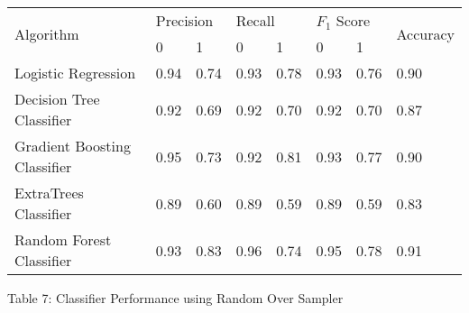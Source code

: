\documentclass[12pt,letter-paper]{article}
\begin{document}
            \begin{table}[H]
        \begin{center}
            \begin{tabular}{|l|l|l|l|l|l|l|l|}
                \hline
                \multirow{2}{*}{Algorithm} & \multicolumn{2}{l|}{Precision} & \multicolumn{2}{l|}{Recall} & \multicolumn{2}{l|}{$F_1$ Score} & \multirow{2}{*}{Accuracy} \\ \cline{2-7}
                                   & 0              & 1             & 0            & 1            & 0             & 1             &                           \\ \hline
            Logistic Regression         & 0.94           & 0.74          & 0.93         & 0.78         & 0.93          & 0.76          & 0.90                     \\ \hline
            Decision Tree Classifier         & 0.92           & 0.69          & 0.92         & 0.70         & 0.92          & 0.70          & 0.87                      \\ \hline
            Gradient Boosting Classifier & 0.95           & 0.73          & 0.92         & 0.81         & 0.93          & 0.77          & 0.90                      \\ \hline
            ExtraTrees Classifier       & 0.89           & 0.60          & 0.89         & 0.59         & 0.89          & 0.59          & 0.83                      \\ \hline
            Random Forest Classifier     & 0.93           & 0.83          & 0.96         & 0.74         & 0.95          & 0.78          & 0.91                      \\ \hline
            \end{tabular}
        \end{center}
        \begin{center}
        Table 7: Classifier Performance using Random Over Sampler
            \end{center}
        \end{table}
        
\end{document}
